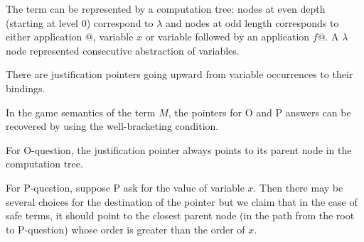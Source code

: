 The term can be represented by a computation tree: nodes at even
depth (starting at level 0) correspond to $\lambda$ and nodes at odd
length corresponds to either application $@$, variable $x$ or
variable followed by an application $f@$. A $\lambda$ node
represented consecutive abstraction of variables.

There are justification pointers going upward from variable
occurrences to their bindings.

In the game semantics of the term $M$, the pointers for O and P
answers can be recovered by using the well-bracketing condition.

For O-question, the justification pointer always points to its
parent node in the computation tree.

For P-question, suppose P ask for the value of variable $x$. Then
there may be several choices for the destination of the pointer but
we claim that in the case of safe terms, it should point to the
closest parent node (in the path from the root to P-question) whose
order is greater than the order of $x$.
